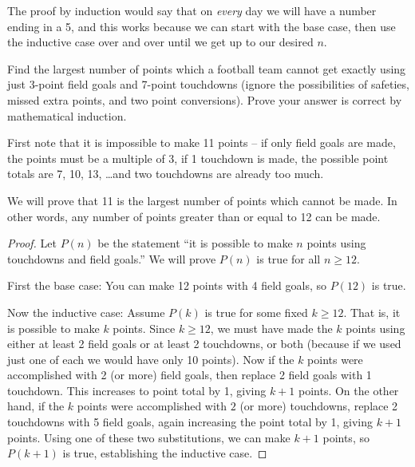 \documentclass[10pt]{exam}
\begin{document}
\begin{questions}
\begin{parts}
\begin{solution}
The proof by induction would say that on \emph{every} day we will have a number ending in a 5, and this works because we can start with the base case, then use the inductive case over and over until we get up to our desired $n$.
\end{solution}
\end{parts}



\question[8] Find the largest number of points which a football team cannot get exactly using just 3-point field goals and 7-point touchdowns (ignore the possibilities of safeties, missed extra points, and two point conversions).  Prove your answer is correct by mathematical induction.

\begin{solution}
  First note that it is impossible to make 11 points -- if only field goals are made, the points must be a multiple of 3, if 1 touchdown is made, the possible point totals are 7, 10, 13, \ldots and two touchdowns are already too much.

  We will prove that 11 is the largest number of points which cannot be made.  In other words, any number of points greater than or equal to 12 can be made.

  \begin{proof}
    Let $P(n)$ be the statement ``it is possible to make $n$ points using touchdowns and field goals.''  We will prove $P(n)$ is true for all $n \ge 12$.

    First the base case: You can make 12 points with 4 field goals, so $P(12)$ is true.

    Now the inductive case: Assume $P(k)$ is true for some fixed $k \ge 12$.  That is, it is possible to make $k$ points.  Since $k \ge 12$, we must have made the $k$ points using either at least 2 field goals or at least 2 touchdowns, or both (because if we used just one of each we would have only 10 points).  Now if the $k$ points were accomplished with 2 (or more) field goals, then replace 2 field goals with 1 touchdown.  This increases to point total by 1, giving $k + 1$ points.  On the other hand, if the $k$ points were accomplished with $2$ (or more) touchdowns, replace 2 touchdowns with 5 field goals, again increasing the point total by 1, giving $k+1$ points.  Using one of these two substitutions, we can make $k+1$ points, so $P(k+1)$ is true, establishing the inductive case.


\end{proof}
\end{solution}
\end{questions}
\end{document}
